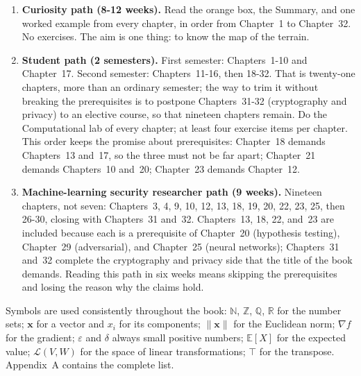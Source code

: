 \begin{enumerate}
  \item \textbf{Curiosity path (8-12 weeks).} Read the orange box, the Summary, and one
        worked example from every chapter, in order from Chapter~1 to Chapter~32. No
        exercises. The aim is one thing: to know the map of the terrain.
  \item \textbf{Student path (2 semesters).} First semester: Chapters~1-10 and
        Chapter~17. Second semester: Chapters~11-16, then 18-32. That is twenty-one
        chapters, more than an ordinary semester; the way to trim it without breaking the
        prerequisites is to postpone Chapters~31-32 (cryptography and privacy) to an
        elective course, so that nineteen chapters remain. Do the Computational lab of
        every chapter; at least four exercise items per chapter. This order keeps the
        promise about prerequisites: Chapter~18 demands Chapters~13 and~17, so the three
        must not be far apart; Chapter~21 demands Chapters~10 and~20; Chapter~23 demands
        Chapter~12.
  \item \textbf{Machine-learning security researcher path (9 weeks).} Nineteen chapters,
        not seven: Chapters~3, 4, 9, 10, 12, 13, 18, 19, 20, 22, 23, 25, then 26-30,
        closing with Chapters~31 and~32. Chapters~13, 18, 22, and~23 are included
        because each is a prerequisite of Chapter~20 (hypothesis testing), Chapter~29
        (adversarial), and Chapter~25 (neural networks); Chapters~31 and~32 complete the
        cryptography and privacy side that the title of the book demands. Reading this
        path in six weeks means skipping the prerequisites and losing the reason why the
        claims hold.
\end{enumerate}

Symbols are used consistently throughout the book: $\mathbb{N}$, $\mathbb{Z}$,
$\mathbb{Q}$, $\mathbb{R}$ for the number sets; $\mathbf{x}$ for a vector and $x_i$ for
its components; $\|\mathbf{x}\|$ for the Euclidean norm; $\nabla f$ for the gradient;
$\varepsilon$ and $\delta$ always small positive numbers; $\mathbb{E}[X]$ for the
expected value; $\mathcal{L}(V,W)$ for the space of linear transformations; $\top$ for
the transpose. Appendix~A contains the complete list.
